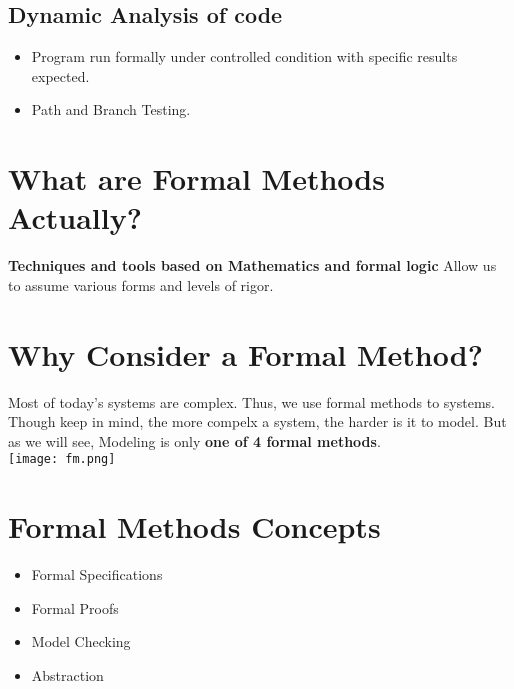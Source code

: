 \documentclass{article}
\begin{document}
    \subsection{Dynamic Analysis of code}
    \begin{itemize}
        \item Program run formally under controlled condition with specific results expected.
        \item Path and Branch Testing.
    \end{itemize}
    \section{What are Formal Methods Actually?}
    \textbf{Techniques and tools based on Mathematics and formal logic}
    Allow us to assume various forms and levels of rigor.\\
    \section{Why Consider a Formal Method?}
    Most of today's systems are complex. Thus, we use formal methods to systems.
    Though keep in mind, the more compelx a system, the harder is it to model.
    But as we will see, Modeling is only \textbf{one of 4 formal methods}.\\
    \texttt{[image: fm.png]}\\
    \section{Formal Methods Concepts}
    \begin{itemize}
        \item Formal Specifications
        \item Formal Proofs
        \item Model Checking
        \item Abstraction
    \end{itemize}
\end{document}
